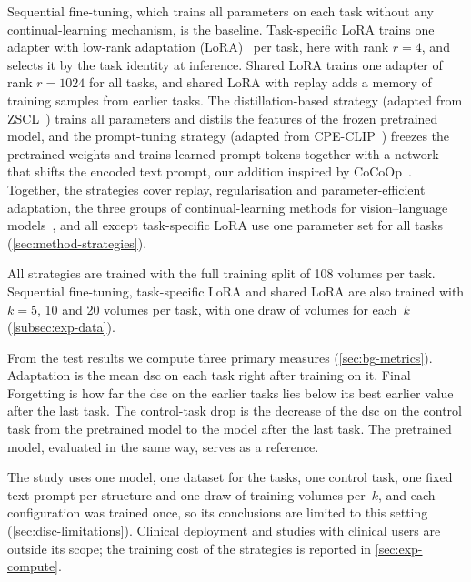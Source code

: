 Sequential fine-tuning, which trains all parameters on each task without any continual-learning mechanism, is the baseline.
Task-specific LoRA trains one adapter with low-rank adaptation (LoRA)~\cite{hu2022lora} per task, here with rank $r = 4$, and selects it by the task identity at inference.
Shared LoRA trains one adapter of rank $r = 1024$ for all tasks, and shared LoRA with replay adds a memory of training samples from earlier tasks.
The distillation-based strategy (adapted from ZSCL~\cite{zheng2023preventingzeroshottransferdegradation}) trains all parameters and distils the features of the frozen pretrained model, and the prompt-tuning strategy (adapted from CPE-CLIP~\cite{D_Alessandro_2023}) freezes the pretrained weights and trains learned prompt tokens together with a network that shifts the encoded text prompt, our addition inspired by CoCoOp~\cite{zhou2022cocoop}.
Together, the strategies cover replay, regularisation and parameter-efficient adaptation, the three groups of continual-learning methods for vision--language models~\cite[Sec.~4]{liu2026continuallearningvlmssurvey}, and all except task-specific LoRA use one parameter set for all tasks (\cref{sec:method-strategies}).

All strategies are trained with the full training split of 108 volumes per task.
Sequential fine-tuning, task-specific LoRA and shared LoRA are also trained with $k = 5$, 10 and 20 volumes per task, with one draw of volumes for each~$k$ (\cref{subsec:exp-data}).

From the test results we compute three primary measures (\cref{sec:bg-metrics}).
Adaptation is the mean \gls{dsc} on each task right after training on it.
Final Forgetting is how far the \gls{dsc} on the earlier tasks lies below its best earlier value after the last task.
The control-task drop is the decrease of the \gls{dsc} on the control task from the pretrained model to the model after the last task.
The pretrained model, evaluated in the same way, serves as a reference.

The study uses one model, one dataset for the tasks, one control task, one fixed text prompt per structure and one draw of training volumes per~$k$, and each configuration was trained once, so its conclusions are limited to this setting (\cref{sec:disc-limitations}).
Clinical deployment and studies with clinical users are outside its scope; the training cost of the strategies is reported in \cref{sec:exp-compute}.

